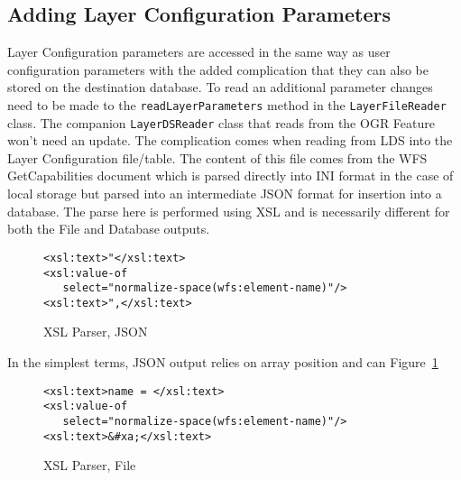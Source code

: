 \documentclass[a4paper]{report}
\begin{document}
\subsection*{Adding Layer Configuration Parameters}
Layer Configuration parameters are accessed in the same way as user
configuration parameters with the added complication that they can also be stored on the
destination database. To read an additional parameter changes need to be made to
the \lstinline|readLayerParameters| method in the
\lstinline|LayerFileReader| class. The companion
\lstinline|LayerDSReader| class that reads from the OGR Feature won't
need an update.
The complication comes when reading from LDS into the Layer Configuration
file/table. The content of this file comes from the WFS GetCapabilities
document which is parsed directly into INI format in the case of local
storage but parsed into an intermediate JSON format for insertion into a
database. The parse here is performed using XSL and is necessarily different for
both the File and Database outputs.

\begin{figure}
\begin{lstlisting}
<xsl:text>"</xsl:text>
<xsl:value-of 
   select="normalize-space(wfs:element-name)"/>
<xsl:text>",</xsl:text>
\end{lstlisting}
\caption{XSL Parser, JSON}
\label{fig:XSLParserJSON}
\end{figure}

In the simplest terms, JSON output relies on array
position and can Figure~\ref{fig:XSLParserJSON}

\begin{figure}
\begin{lstlisting}
<xsl:text>name = </xsl:text>
<xsl:value-of 
   select="normalize-space(wfs:element-name)"/>
<xsl:text>&#xa;</xsl:text>
\end{lstlisting}
\caption{XSL Parser, File}
\label{fig:XSLParserFile}
\end{figure}

 
\end{document}
